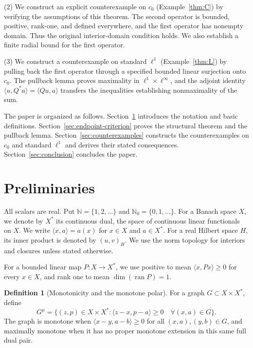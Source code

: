 \documentclass[11pt]{article}
\newcommand{\N}{\mathbb N}
\newcommand{\Nzero}{\mathbb N_0}
\newcommand{\pair}[2]{\langle #1,#2\rangle}
\theoremstyle{definition}
\newtheorem{definition}{Definition}
\theoremstyle{remark}
\begin{document}
(2) We construct an explicit counterexample on $c_0$ (Example~\ref{thm:C}) by verifying the assumptions of this theorem. The second operator is bounded, positive, rank-one, and defined everywhere, and the first operator has nonempty domain. Thus the original interior-domain condition holds. We also establish a finite radial bound for the first operator.

(3) We construct a counterexample on standard $\ell^1$ (Example~\ref{thm:L}) by pulling back the first operator through a specified bounded linear surjection onto $c_0$. The pullback lemma proves maximality in $\ell^1\times\ell^\infty$, and the adjoint identity $\pair{u}{Q^*a}=\pair{Qu}{a}$ transfers the inequalities establishing nonmaximality of the sum.

The paper is organized as follows. Section~\ref{sec:definitions} introduces the notation and basic definitions. Section~\ref{sec:endpoint-criterion} proves the structural theorem and the pullback lemma. Section~\ref{sec:counterexamples} constructs the counterexamples on $c_0$ and standard $\ell^1$ and derives their stated consequences. Section~\ref{sec:conclusion} concludes the paper.


\section{Preliminaries}
\label{sec:definitions}
All scalars are real. Put $\N=\{1,2,\ldots\}$ and $\Nzero=\{0,1,\ldots\}$. For a Banach space $X$, we denote by $X^*$ its continuous dual, the space of continuous linear functionals on $X$. We write $\pair{x}{a}=a(x)$ for $x\in X$ and $a\in X^*$. For a real Hilbert space $H$, its inner product is denoted by $(u,v)_H$. We use the norm topology for interiors and closures unless stated otherwise.

For a bounded linear map $P:X\to X^*$, we use positive to mean $\pair{x}{Px}\ge0$ for every $x\in X$, and rank one to mean $\dim(\operatorname{ran}P)=1$.

\begin{definition}[Monotonicity and the monotone polar]
For a graph $G\subset X\times X^*$, define
\begin{equation}
G^\mu=\{(z,p)\in X\times X^*:
 \pair{z-x}{p-a}\ge0\quad\forall(x,a)\in G\}.
\label{eq:D1}
\end{equation}
The graph is monotone when $\pair{x-y}{a-b}\ge0$ for all $(x,a),(y,b)\in G$, and maximally monotone when it has no proper monotone extension in this same full dual pair.
\end{definition}
\end{document}
